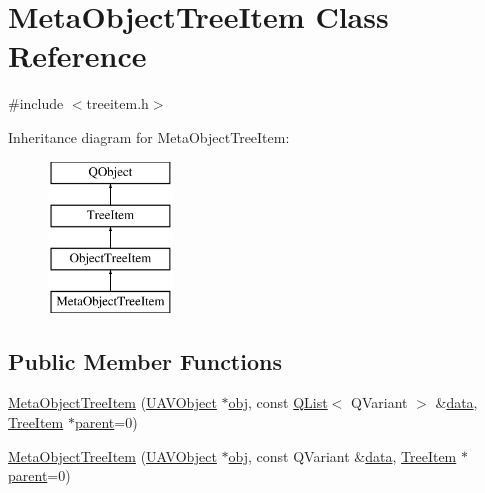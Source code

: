 \hypertarget{class_meta_object_tree_item}{\section{Meta\-Object\-Tree\-Item Class Reference}
\label{class_meta_object_tree_item}
}


{\ttfamily \#include $<$treeitem.\-h$>$}

Inheritance diagram for Meta\-Object\-Tree\-Item\-:\begin{figure}[H]
\begin{center}
\leavevmode
\includegraphics[height=4.000000cm]{class_meta_object_tree_item}
\end{center}
\end{figure}
\subsection*{Public Member Functions}
\begin{DoxyCompactItemize}
\item 
\hyperlink{group___u_a_v_object_browser_plugin_gaccbd935f55017692b1051678b5f53ad8}{Meta\-Object\-Tree\-Item} (\hyperlink{class_u_a_v_object}{U\-A\-V\-Object} $\ast$\hyperlink{glext_8h_a0c0d4701a6c89f4f7f0640715d27ab26}{obj}, const \hyperlink{class_q_list}{Q\-List}$<$ Q\-Variant $>$ \&\hyperlink{glext_8h_a8850df0785e6fbcc2351af3b686b8c7a}{data}, \hyperlink{class_tree_item}{Tree\-Item} $\ast$\hyperlink{group___u_a_v_object_browser_plugin_gaa3a7ba624312b6be70872634db291881}{parent}=0)
\item 
\hyperlink{group___u_a_v_object_browser_plugin_ga13e8806399befff9a6db4becc66810d7}{Meta\-Object\-Tree\-Item} (\hyperlink{class_u_a_v_object}{U\-A\-V\-Object} $\ast$\hyperlink{glext_8h_a0c0d4701a6c89f4f7f0640715d27ab26}{obj}, const Q\-Variant \&\hyperlink{glext_8h_a8850df0785e6fbcc2351af3b686b8c7a}{data}, \hyperlink{class_tree_item}{Tree\-Item} $\ast$\hyperlink{group___u_a_v_object_browser_plugin_gaa3a7ba624312b6be70872634db291881}{parent}=0)
\end{DoxyCompactItemize}

